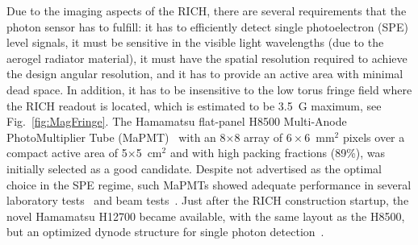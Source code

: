 \documentclass[5p,times,twocolumn]{elsarticle}
\def\MaPMT{MaPMT }
\begin{document}
Due to the imaging aspects of the RICH, there are several requirements that the photon sensor has to fulfill: it has
to efficiently detect single photoelectron (SPE) level signals, it must be sensitive in the visible light wavelengths (due
to the aerogel radiator material), it must have the spatial resolution required to achieve the design angular resolution,
and it has to provide an active area with minimal dead space. In addition, it has to be insensitive to the low torus fringe
field where the RICH readout is located, which is estimated to be 3.5~G maximum, see Fig.~\ref{fig:MagFringe}.
The Hamamatsu flat-panel H8500 Multi-Anode PhotoMultiplier Tube (MaPMT)~\cite{Ref:H8500} with an 8$\times$8
array of $6 \times 6$~mm$^2$ pixels over a compact active area of 5$\times$5~cm$^2$ and with high packing
fractions (89\%), was initially selected as a good candidate.
Despite not advertised as the optimal choice in the SPE regime, such MaPMTs showed adequate performance in several
laboratory tests~\cite{REF:MaPMT_test} and beam tests~\cite{REF:RICH_CERN}.
Just after the RICH construction startup, the novel Hamamatsu H12700 became available, with the same layout as
the H8500, but an optimized dynode structure for single photon detection~\cite{Ref:H12700}.
\end{document}
